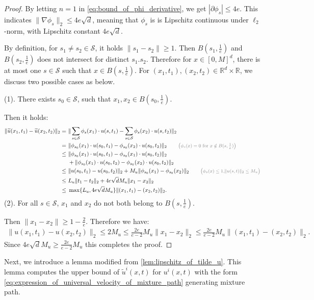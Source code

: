 \documentclass[12pt]{article}
\numberwithin{equation}{section}
\let\tilde\widetilde
\newcommand{\wt}{\widetilde}
\renewcommand{\tilde}{\wt}
\def\R{\mathbb{R}}
\theoremstyle{theoremstyle}
\numberwithin{equation}{section}
\numberwithin{theorem}{section}
\numberwithin{proposition}{section}
\numberwithin{definition}{section}
\numberwithin{lemma}{section}
\numberwithin{assumption}{section}
\numberwithin{remark}{section}
\newcommand*{\annot}[1]{\tag*{\footnotesize{\textcolor{black!50}{\big(#1\big)}}}}
\begin{document}
\begin{proof}
By letting $n=1$ in \eqref{eq:bound_of_phi_derivative}, we get $|\partial\phi_s|\leq4e$.
This indicates $\|\nabla\phi_s\|_2\leq4e\sqrt{d}$, meaning that $\phi_s$ is is Lipschitz continuous under $\ell_2$-norm,  with Lipschitz constant $4e\sqrt{d}$.

By definition, for $s_1\neq s_2\in \mathcal{S}$, 
it holds $\|s_1-s_2\|\geq 1$.
Then $B(s_1,\frac{1}{e})$ and $B(s_2,\frac{1}{e})$ does not intersect for distinct $s_1.s_2$.
Therefore for $x\in [0,M]^d$, there is at most one $s\in \mathcal{S}$ such that $x\in B(s,\frac{1}{e})$.
For $(x_1,t_1),(x_2,t_2)\in\R^d\times\R$, we discuss two possible cases as below.

(1). There exists $s_0\in \mathcal{S}$, such that $x_1,x_2\in B(s_0,\frac{1}{e})$.

Then it holds:
\begin{align*}
    \|\tilde{u}(x_1,t_1)-\tilde{u}(x_2,t_2)\|_2 = & ~
    \|\sum_{s\in \mathcal{S}} \phi_s(x_1)\cdot u(s,t_1)-\sum_{s\in \mathcal{S}} \phi_s(x_2)\cdot u(s,t_2)\|_2 \\
    = & ~
    \|\phi_{s_0}(x_1)\cdot u(s_0,t_1)-\phi_{s_0}(x_2)\cdot u(s_0,t_2)\|_2 \annot{$\phi_s(x)=0$ for $x\notin B(s,\frac{1}{e})$}\\
    \leq & ~
    \|\phi_{s_0}(x_1)\cdot u(s_0,t_1)-\phi_{s_0}(x_1)\cdot u(s_0,t_2)\|_2\\
    & ~ +
    \|\phi_{s_0}(x_1)\cdot u(s_0,t_2)-\phi_{s_0}(x_2)\cdot u(s_0,t_2)\|_2 \\
    \leq & ~
    \|u(s_0,t_1)-u(s_0,t_2)\|_2+M_u\|\phi_{s_0}(x_1)-\phi_{s_0}(x_2)\|_2 
    \annot{$\phi_s(x)\leq 1$,$\|u(s,t)\|_2\leq M_u$}\\
    \leq & ~
    L_u\|t_1-t_2\|_2+4e\sqrt{d}M_u\|x_1-x_2\|_2 \\
    \leq & ~
    \max\{L_u,4e\sqrt{d}M_u\}\|(x_1,t_1)-(x_2,t_2)\|_2.
\end{align*}
(2). For all $s\in \mathcal{S}$, $x_1$ and $x_2$ do not both belong to $B(s,\frac{1}{e})$.

Then $\|x_1-x_2\|\geq1-\frac{2}{e}$.
Therefore we have:
\begin{align*}
    \|u(x_1,t_1)-u(x_2,t_2)\|_2\leq 2M_u \leq \frac{2e}{e-2}M_u\|x_1-x_2\|_2 \leq \frac{2e}{e-2}M_u\|(x_1,t_1)-(x_2,t_2)\|_2.
\end{align*}
Since $4e\sqrt{d}M_u\geq\frac{2e}{e-2}M_u$ this completes the proof.
\end{proof}

Next, we introduce a lemma modified from \cref{lem:lipschitz_of_tilde_u}.
This lemma computes the upper bound of $\tilde{u}^i(x,t)$ for $u^i(x,t)$ with the form \eqref{eq:expression_of_universal_velocity_of_mixture_path} generating mixture path.
\end{document}
